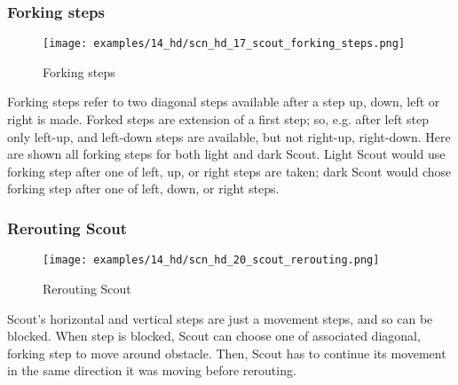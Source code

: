 \vspace*{-0.7\baselineskip}
\subsubsection*{Forking steps}
\label{sec:Hemera's Dawn/Scout/Movement/Forking steps}

\vspace*{-0.7\baselineskip}
\noindent
\begin{wrapfigure}[11]{l}{0.4\textwidth}
\centering
\texttt{[image: examples/14\_hd/scn\_hd\_17\_scout\_forking\_steps.png]}
\vspace*{-0.3\baselineskip}
\caption{Forking steps}
\label{fig:scn_hd_17_scout_forking_steps}
\end{wrapfigure}
Forking steps refer to two diagonal steps available after a step up, down, left
or right is made. \newline
\indent
Forked steps are extension of a first step; so, e.g. after left step only left-up,
and left-down steps are available, but not right-up, right-down. \newline
\indent
Here are shown all forking steps for both light and dark Scout. Light Scout would
use forking step after one of left, up, or right steps are taken; dark Scout would
chose forking step after one of left, down, or right steps.

\clearpage %

\subsubsection*{Rerouting Scout}
\label{sec:Hemera's Dawn/Scout/Movement/Rerouting Scout}

\vspace*{-0.7\baselineskip}
\noindent
\begin{wrapfigure}[9]{l}{0.41\textwidth}
\centering
\texttt{[image: examples/14\_hd/scn\_hd\_20\_scout\_rerouting.png]}
\vspace*{-0.3\baselineskip}
\caption{Rerouting Scout}
\label{fig:scn_hd_20_scout_rerouting}
\end{wrapfigure}
Scout's horizontal and vertical steps are just a movement steps, and so can be blocked.
When step is blocked, Scout can choose one of associated diagonal, forking step to
move around obstacle. Then, Scout has to continue its movement in the same direction
it was moving before rerouting.

